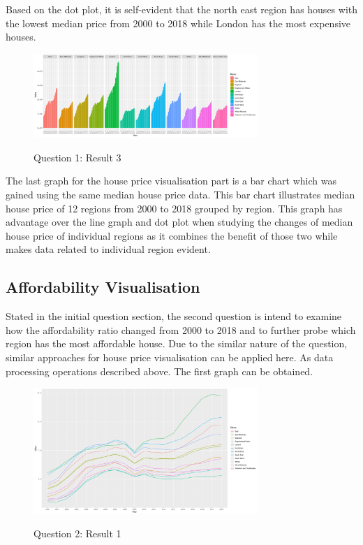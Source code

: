 \documentclass{article}
\begin{document}
Based on the dot plot, it is self-evident that the north east region has houses with the lowest median price 
from 2000 to 2018 while London has the most expensive houses.

\begin{figure}[htb]
  \begin{minipage}[b]{1.0\linewidth}
    \centering
    \centerline{\includegraphics[width=8.5cm]{Q1Geom_gridbar}}
    \centerline{Question 1: Result 3}\medskip
  \end{minipage}
\end{figure}

The last graph for the house price visualisation part is a bar chart which was gained using the same 
median house price data. This bar chart illustrates median house price of 12 regions from 2000 to 2018 
grouped by region. This graph has advantage over the line graph and dot plot when studying the changes of median house price of individual 
regions as it combines the benefit of those two while makes data related to individual region evident.



\subsection{Affordability Visualisation}
Stated in the initial question section, the second question is intend to examine how the affordability ratio changed from 2000 to 2018 
and to further probe which region has the most affordable house. Due to the similar nature of the question, 
similar approaches for house price visualisation can be applied here. As data processing operations described above. 
The first graph can be obtained.

\begin{figure}[htb]
  \begin{minipage}[b]{1.0\linewidth}
    \centering
    \centerline{\includegraphics[width=8.5cm]{Q2Geom_line}}
    \centerline{Question 2: Result 1}\medskip
  \end{minipage}
\end{figure}
\end{document}
